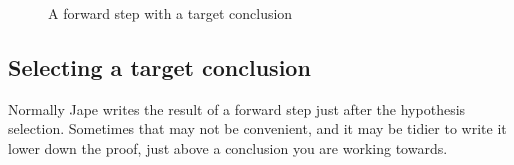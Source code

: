 \documentclass[11pt]{book}
\begin{document}
\begin{figure}
\centering
{}
\qquad
{}
\caption{A forward step with a target conclusion}
\label{fig:hypselectedwithtarget}
\end{figure}

\subsection{Selecting a target conclusion}

Normally Jape writes the result of a forward step just after 
the hypothesis selection. Sometimes that may not be convenient, 
and it may be tidier to write it lower down the proof, just above 
a conclusion you are working towards.
\end{document}
